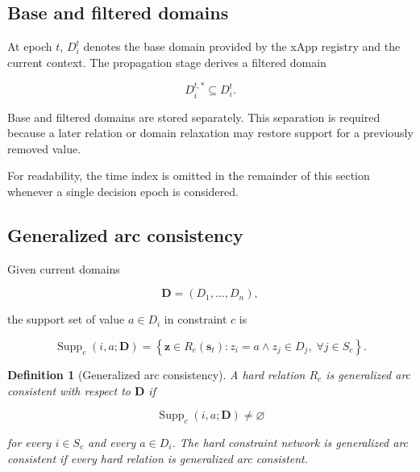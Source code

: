 \documentclass[pdflatex,sn-mathphys-num,iicol,oneside]{sn-jnl}
\newtheorem{definition}{Definition}
\begin{document}
\subsection{Base and filtered domains}

At epoch $t$, $D_i^t$ denotes the base domain provided by the xApp
registry and the current context. The propagation stage derives a
filtered domain

\begin{equation}
D_i^{t,*}\subseteq D_i^t.
\end{equation}

Base and filtered domains are stored separately. This separation is
required because a later relation or domain relaxation may restore
support for a previously removed value.

For readability, the time index is omitted in the remainder of this
section whenever a single decision epoch is considered.

\subsection{Generalized arc consistency}

Given current domains

\begin{equation}
\bm{D}=(D_1,\ldots,D_n),
\end{equation}

the support set of value $a\in D_i$ in constraint $c$ is

\begin{equation}
\operatorname{Supp}_{c}
(i,a;\bm{D})
=
\left\{
\bm{z}\in R_c(\bm{s}_t):
z_i=a
\land
z_j\in D_j,\;
\forall j\in S_c
\right\}.
\label{eq:support}
\end{equation}

\begin{definition}[Generalized arc consistency]
A hard relation $R_c$ is generalized arc consistent with respect to
$\bm{D}$ if

\begin{equation}
\operatorname{Supp}_{c}(i,a;\bm{D})
\neq\varnothing
\end{equation}

for every $i\in S_c$ and every $a\in D_i$. The hard constraint
network is generalized arc consistent if every hard relation is
generalized arc consistent.
\end{definition}
\end{document}
